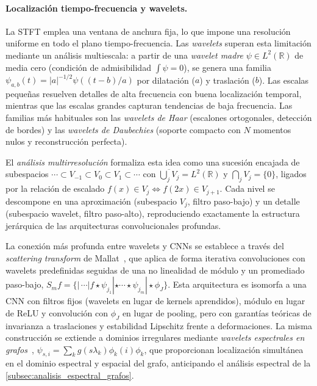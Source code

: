 \paragraph{Localización tiempo-frecuencia y wavelets.} La STFT emplea una ventana de anchura fija, lo que impone una resolución uniforme en todo el plano tiempo-frecuencia. Las \textit{wavelets} superan esta limitación mediante un análisis multiescala: a partir de una \textit{wavelet madre} $\psi \in L^2(\mathbb{R})$ de media cero (condición de admisibilidad $\int \psi = 0$), se genera una familia $\psi_{a,b}(t) = |a|^{-1/2}\psi((t-b)/a)$ por dilatación ($a$) y traslación ($b$). Las escalas pequeñas resuelven detalles de alta frecuencia con buena localización temporal, mientras que las escalas grandes capturan tendencias de baja frecuencia. Las familias más habituales son las \textit{wavelets de Haar} (escalones ortogonales, detección de bordes) y las \textit{wavelets de Daubechies} (soporte compacto con $N$ momentos nulos y reconstrucción perfecta).

El \textit{análisis multirresolución} formaliza esta idea como una sucesión encajada de subespacios $\cdots \subset V_{-1} \subset V_0 \subset V_1 \subset \cdots$ con $\overline{\bigcup_j V_j} = L^2(\mathbb{R})$ y $\bigcap_j V_j = \{0\}$, ligados por la relación de escalado $f(x) \in V_j \Leftrightarrow f(2x) \in V_{j+1}$. Cada nivel se descompone en una aproximación (subespacio $V_j$, filtro paso-bajo) y un detalle (subespacio wavelet, filtro paso-alto), reproduciendo exactamente la estructura jerárquica de las arquitecturas convolucionales profundas.

\begin{remark}
La conexión más profunda entre wavelets y CNNs se establece a través del \textit{scattering transform} de Mallat~\citep{Mallat2012scattering}, que aplica de forma iterativa convoluciones con wavelets predefinidas seguidas de una no linealidad de módulo y un promediado paso-bajo, $S_m f = \{|\,\cdots|f \star \psi_{j_1}| \star \cdots \star \psi_{j_m}| \star \phi_J\}$. Esta arquitectura es isomorfa a una CNN con filtros fijos (wavelets en lugar de kernels aprendidos), módulo en lugar de ReLU y convolución con $\phi_J$ en lugar de pooling, pero con garantías teóricas de invarianza a traslaciones y estabilidad Lipschitz frente a deformaciones. La misma construcción se extiende a dominios irregulares mediante \textit{wavelets espectrales en grafos}~\citep{hammond2011wavelets}, $\psi_{s,i} = \sum_k g(s\lambda_k)\phi_k(i)\phi_k$, que proporcionan localización simultánea en el dominio espectral y espacial del grafo, anticipando el análisis espectral de la \autoref{subsec:analisis_espectral_grafos}.
\end{remark}


